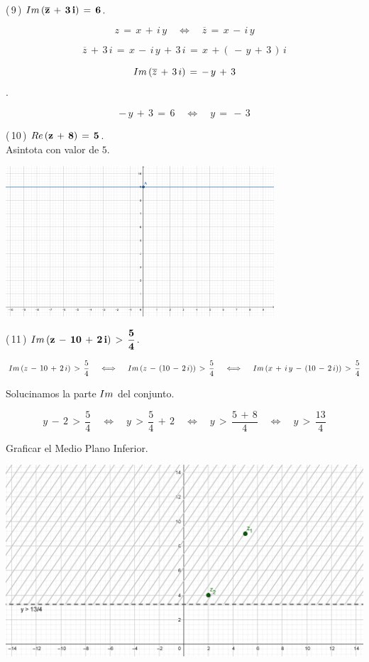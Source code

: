 \documentclass[a4paper,11pt,openany]{book}
\begin{document}
\textcolor{ao(english)}{(\,9\,)} $\bf{\mathnormal{Im}\,(\overline{z}\,+\,3\,i)\,=\,6}$.

$$z\,=\,x\,+\,i\,y \quad\iff\quad \overline{z}\,=\,x\,-\,i\,y $$

$$\overline{z}\,+\,3\,i\,=\,x\,-\,i\,y\,+\,3\,i\,=\,x\,+(\,-\,y\,+\,3\,)\,i$$

$$\mathnormal{Im}\,(\overline{z}\,+\,3\,i)\,=\,-\,y\,+\,3$$.

$$-\,y\,+\,3\,=\,6 \quad\iff\quad y\,=\,-\,3$$

\textcolor{ao(english)}{(\,10\,)} $\bf{\mathnormal{Re}\,(z\,+\,8)\,=\,5}$.\\

Asintota con valor de $5$.\\

\begin{center}
    \includegraphics[width=10cm]{Gra-Ej-9.png}
\end{center}

\textcolor{ao(english)}{(\,11\,)} $\bf{\mathnormal{Im}\,(z\,-\,10\,+\,2\,i)\,>\,\dfrac{5}{4}}$.

$$\mathnormal{Im}\,(z\,-\,10\,+\,2\,i)\,>\,\dfrac{5}{4} \quad\iff\quad \mathnormal{Im}\,(z\,-\,(10\,-\,2\,i))\,>\,\dfrac{5}{4} \quad\iff\quad \mathnormal{Im}\,(x\,+\,i\,y\,-\,(10\,-\,2\,i))\,>\,\dfrac{5}{4}$$

\textcolor{ao(english)}{} Solucinamos la parte $\mathnormal{Im}$ del conjunto.

$$y\,-\,2\,>\,\dfrac{5}{4} \quad\iff\quad y\,>\,\dfrac{5}{4}\,+\,2 \quad\iff\quad y\,>\,\dfrac{5\,+\,8}{4} \quad\iff\quad y\,>\,\dfrac{13}{4}$$

\textcolor{ao(english)}{} Graficar el Medio Plano Inferior.

\begin{center}
    \includegraphics[width=15cm]{Gra-Ej-11.png}
\end{center}
\end{document}
